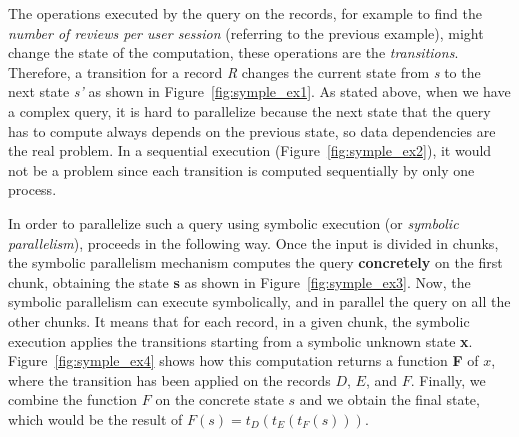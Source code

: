 \begin{refsection}
\noindent
The operations executed by the query on the records, for example to find the
\emph{number of reviews per user session} (referring to the previous example),
might change the state of the computation, these operations are the
\emph{transitions}.
%
Therefore, a transition for a record \emph{R} changes the current state from
\emph{s} to the next state \emph{s'} as shown in Figure~\ref{fig:symple_ex1}.
%
As stated above, when we have a complex query, it is hard to parallelize
because the next state that the query has to compute always depends on the
previous state, so data dependencies are the real problem.
%
In a sequential execution (Figure~\ref{fig:symple_ex2}), it would not be a
problem since each transition is computed sequentially by only one process.

In order to parallelize such a query using symbolic execution (or
\emph{symbolic parallelism}), \symp proceeds in the following way.
%
Once the input is divided in chunks, the symbolic parallelism mechanism
computes the query \textbf{concretely} on the first chunk, obtaining the state
\textbf{s} as shown in Figure~\ref{fig:symple_ex3}.
%
Now, the symbolic parallelism can execute symbolically, and in parallel the
query on all the other chunks.
%
It means that for each record, in a given chunk, the symbolic execution
applies the transitions starting from a symbolic unknown state \textbf{x}.
%
Figure~\ref{fig:symple_ex4} shows how this computation returns a function
\textbf{F} of $x$, where the transition has been applied on the records $D$,
$E$, and $F$.
%
Finally, we combine the function $F$ on the concrete state $s$ and we obtain
the final state, which would be the result of $F(s) = t_D(t_E(t_F(s)))$.



\end{refsection}
